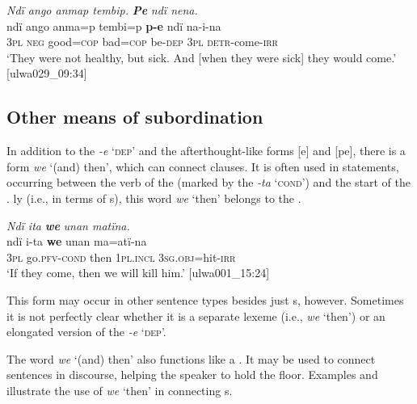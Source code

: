 \ea%
    \label{ex:complex:77}
          \textit{Ndï ango anmap tembip.} \textbf{\textit{Pe}} \textit{ndï nena.}\\
\gll    ndï  ango  anma=p  tembi=p  \textbf{p-e}    ndï  na-i-na\\
    \textsc{3pl}  \textsc{neg}  good=\textsc{cop}  bad=\textsc{cop}  be-\textsc{dep}  \textsc{3pl}  \textsc{detr-}come\textsc{{}-irr}\\
\glt `They were not healthy, but sick. And [when they were sick] they would come.’ [ulwa029\_09:34]
\z

\subsection{Other means of subordination}\label{sec:12.2.7}


In addition to the   \textit{-e} ‘\textsc{dep}’ and the afterthought-like forms [e] and [pe], there is a form \textit{we} ‘(and) then’, which can connect clauses. It is often used in  statements, occurring between the verb of the  (marked by the   \textit{-ta} ‘\textsc{cond}’) and the start of the  . ly (i.e., in terms of s), this word \textit{we} ‘then’ belongs to the .

\ea%
    \label{ex:complex:78}
          \textit{Ndï ita} \textbf{\textit{we}} \textit{unan matïna.}\\
\gll    ndï  i-ta        \textbf{we}    unan    ma=atï-na\\
    3\textsc{pl}  go.\textsc{pfv-cond}  then  \textsc{1pl.incl}  3\textsc{sg.obj}=hit-\textsc{irr}\\
\glt `If they come, then we will kill him.’ [ulwa001\_15:24]
\z

This form may occur in other sentence types besides just s, however. Sometimes it is not perfectly clear whether it is a separate lexeme (i.e., \textit{we} ‘then’) or an elongated version of the  \textit{-e} ‘\textsc{dep}’.

  The word \textit{we} ‘(and) then’ also functions like a . It may be used to connect sentences in discourse, helping the speaker to  hold the floor. Examples  and  illustrate the use of \textit{we} ‘then’ in connecting s.

